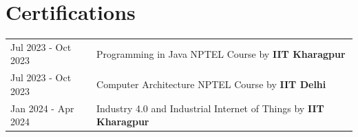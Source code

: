 \documentclass[a4paper,12pt]{article}
\begin{document}
\section{Certifications}
\begin{tabularx}{\linewidth}{@{}l X@{}}	
Jul 2023 - Oct 2023 & Programming in Java NPTEL Course by  \textbf{IIT Kharagpur} \hfill \normalsize \\
Jul 2023 - Oct 2023 & Computer Architecture NPTEL Course by \textbf{IIT Delhi}\hfill   \\

Jan 2024 - Apr 2024 & Industry 4.0 and Industrial Internet of Things by \textbf{IIT Kharagpur} \hfill \\
\end{tabularx}

\end{document}
